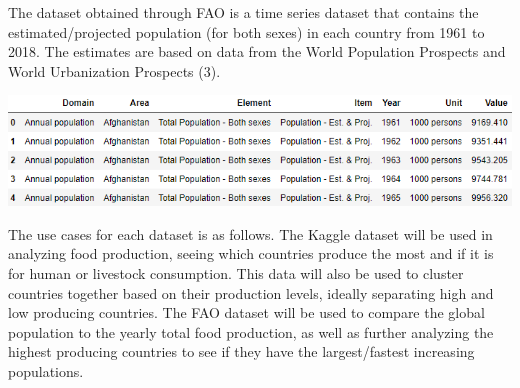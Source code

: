 \documentclass[12pt, a4paper]{article}
\begin{document}
\begin{spacing}{1.1}
	The dataset obtained through FAO is a time series dataset that contains the estimated/projected population (for both sexes) in each country from 1961 to 2018. The estimates are based on data from the World Population Prospects and World Urbanization Prospects (3).
	\begin{center}	\includegraphics[scale=.8]{pop_data}	\end{center} \newpage


	\noindent The use cases for each dataset is as follows. The Kaggle dataset will be used in analyzing food production, seeing which countries produce the most and if it is for human or livestock consumption. This data will also be used to cluster countries together based on their production levels, ideally separating high and low producing countries. The FAO dataset will be used to compare the global population to the yearly total food production, as well as further analyzing the highest producing countries to see if they have the largest/fastest increasing populations.	
	

\end{spacing}
\end{document}
